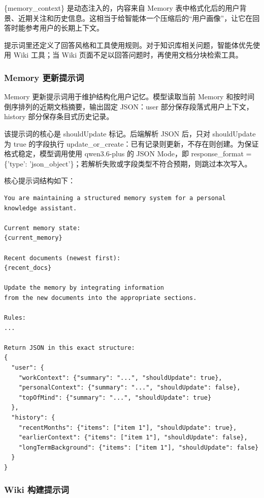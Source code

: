 \{memory\_context\} 是动态注入的，内容来自 Memory 表中格式化后的用户背景、近期关注和历史信息。这相当于给智能体一个压缩后的“用户画像”，让它在回答时能参考用户的长期上下文。

提示词里还定义了回答风格和工具使用规则。对于知识库相关问题，智能体优先使用 Wiki 工具；当 Wiki 页面不足以回答问题时，再使用文档分块检索工具。

\subsubsection{Memory 更新提示词}

Memory 更新提示词用于维护结构化用户记忆。模型读取当前 Memory 和按时间倒序排列的近期文档摘要，输出固定 JSON：user 部分保存段落式用户上下文，history 部分保存条目式历史记录。

该提示词的核心是 shouldUpdate 标记。后端解析 JSON 后，只对 shouldUpdate 为 true 的字段执行 update\_or\_create：已有记录则更新，不存在则创建。为保证格式稳定，模型调用使用 qwen3.6-plus 的 JSON Mode，即 response\_format = \{'type': 'json\_object'\}；若解析失败或字段类型不符合预期，则跳过本次写入。

核心提示词结构如下：

\begin{lstlisting}[style=mtcode,caption={Memory 更新提示词结构}]
You are maintaining a structured memory system for a personal knowledge assistant.

Current memory state:
{current_memory}

Recent documents (newest first):
{recent_docs}

Update the memory by integrating information
from the new documents into the appropriate sections.

Rules:
...

Return JSON in this exact structure:
{
  "user": {
    "workContext": {"summary": "...", "shouldUpdate": true},
    "personalContext": {"summary": "...", "shouldUpdate": false},
    "topOfMind": {"summary": "...", "shouldUpdate": true}
  },
  "history": {
    "recentMonths": {"items": ["item 1"], "shouldUpdate": true},
    "earlierContext": {"items": ["item 1"], "shouldUpdate": false},
    "longTermBackground": {"items": ["item 1"], "shouldUpdate": false}
  }
}
\end{lstlisting}

\subsubsection{Wiki 构建提示词}

